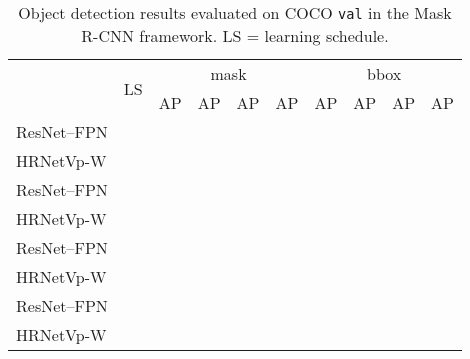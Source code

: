 \documentclass[10pt,twocolumn,letterpaper]{article}
\begin{document}
\renewcommand{\arraystretch}{1.3}
	\begin{table}[t]
	\setlength{\tabcolsep}{2.3pt}
	\centering
	\caption{Object detection results evaluated on COCO \texttt{val}
	in the Mask R-CNN framework.
	LS = learning schedule.}
	\label{tab:object_detection_maskrcnn}
	\scriptsize
	\begin{tabular}{l|c|cccc|cccc}
		\hline \noalign{\smallskip}
		\multirow{2}{*}{backbone} &
		\multirow{2}{*}{LS} & \multicolumn{4}{c|}{mask} & \multicolumn{4}{c}{bbox} \\
		\cline{3-10}&  & AP & AP & AP & AP & AP & AP & AP & AP \\
		\hline

		\hline
	    ResNet--FPN &   &  &  &  &  &  &  &  &   \\
		HRNetVp-W &  &  &  &  &  &  &  &  &   \\
ResNet--FPN &   &  &  &  &  &  &  &  &   \\
		HRNetVp-W &  &  &  &  &  &  &  &  &   \\
	    \hline
		ResNet--FPN &  &  &  &  &  &  &  &  &   \\
		HRNetVp-W &  &  &  &  &  &  &  &  &   \\
ResNet--FPN &  &  &  &  &  &  &  &  &   \\
		HRNetVp-W &  &  &  &  &  &  &  &  &  \\
		\hline
	\end{tabular}
	\vspace{-0.4cm}
	\end{table}
\end{document}
